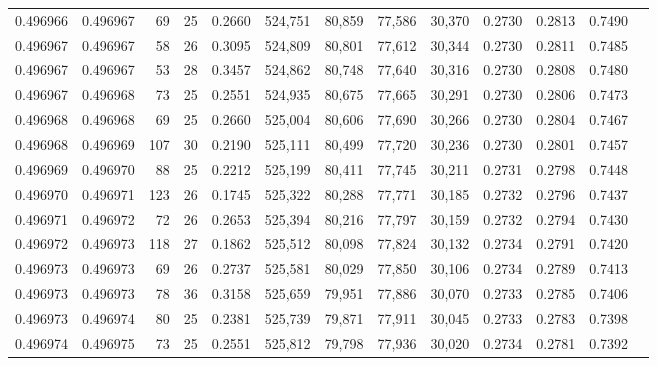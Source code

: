 \begin{tabular}{rrrrrrrrrrrrr}
0.496966 & 0.496967 &  69 &  25 &                                     0.2660 & 524,751 &  80,859 &  77,586 &  30,370 & 0.2730 & 0.2813 & 0.7490 \\
0.496967 & 0.496967 &  58 &  26 &                                     0.3095 & 524,809 &  80,801 &  77,612 &  30,344 & 0.2730 & 0.2811 & 0.7485 \\
0.496967 & 0.496967 &  53 &  28 &                                     0.3457 & 524,862 &  80,748 &  77,640 &  30,316 & 0.2730 & 0.2808 & 0.7480 \\
0.496967 & 0.496968 &  73 &  25 &                                     0.2551 & 524,935 &  80,675 &  77,665 &  30,291 & 0.2730 & 0.2806 & 0.7473 \\
0.496968 & 0.496968 &  69 &  25 &                                     0.2660 & 525,004 &  80,606 &  77,690 &  30,266 & 0.2730 & 0.2804 & 0.7467 \\
0.496968 & 0.496969 & 107 &  30 &                                     0.2190 & 525,111 &  80,499 &  77,720 &  30,236 & 0.2730 & 0.2801 & 0.7457 \\
0.496969 & 0.496970 &  88 &  25 &                                     0.2212 & 525,199 &  80,411 &  77,745 &  30,211 & 0.2731 & 0.2798 & 0.7448 \\
0.496970 & 0.496971 & 123 &  26 &                                     0.1745 & 525,322 &  80,288 &  77,771 &  30,185 & 0.2732 & 0.2796 & 0.7437 \\
0.496971 & 0.496972 &  72 &  26 &                                     0.2653 & 525,394 &  80,216 &  77,797 &  30,159 & 0.2732 & 0.2794 & 0.7430 \\
0.496972 & 0.496973 & 118 &  27 &                                     0.1862 & 525,512 &  80,098 &  77,824 &  30,132 & 0.2734 & 0.2791 & 0.7420 \\
0.496973 & 0.496973 &  69 &  26 &                                     0.2737 & 525,581 &  80,029 &  77,850 &  30,106 & 0.2734 & 0.2789 & 0.7413 \\
0.496973 & 0.496973 &  78 &  36 &                                     0.3158 & 525,659 &  79,951 &  77,886 &  30,070 & 0.2733 & 0.2785 & 0.7406 \\
0.496973 & 0.496974 &  80 &  25 &                                     0.2381 & 525,739 &  79,871 &  77,911 &  30,045 & 0.2733 & 0.2783 & 0.7398 \\
0.496974 & 0.496975 &  73 &  25 &                                     0.2551 & 525,812 &  79,798 &  77,936 &  30,020 & 0.2734 & 0.2781 & 0.7392 \\

\end{tabular}
